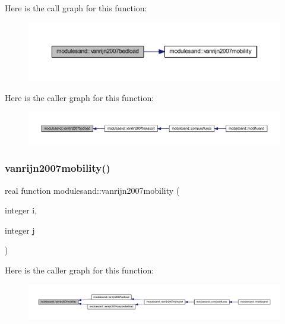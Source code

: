 Here is the call graph for this function\+:\nopagebreak
\begin{figure}[H]
\begin{center}
\leavevmode
\includegraphics[width=350pt]{namespacemodulesand_a977db0c285efea44306fcc4bd320dc10_cgraph}
\end{center}
\end{figure}
Here is the caller graph for this function\+:\nopagebreak
\begin{figure}[H]
\begin{center}
\leavevmode
\includegraphics[width=350pt]{namespacemodulesand_a977db0c285efea44306fcc4bd320dc10_icgraph}
\end{center}
\end{figure}
\mbox{\label{namespacemodulesand_a484efe5d2e2a5463e1f1257ca84852b1}} 
\subsubsection{\texorpdfstring{vanrijn2007mobility()}{vanrijn2007mobility()}}
{\footnotesize\ttfamily real function modulesand\+::vanrijn2007mobility (\begin{DoxyParamCaption}\item[{integer}]{i,  }\item[{integer}]{j }\end{DoxyParamCaption})\hspace{0.3cm}{\ttfamily [private]}}

Here is the caller graph for this function\+:\nopagebreak
\begin{figure}[H]
\begin{center}
\leavevmode
\includegraphics[width=350pt]{namespacemodulesand_a484efe5d2e2a5463e1f1257ca84852b1_icgraph}
\end{center}
\end{figure}
\mbox{\label{namespacemodulesand_ad4f562b0c7304b99b372a946d8cab5b1}} 
